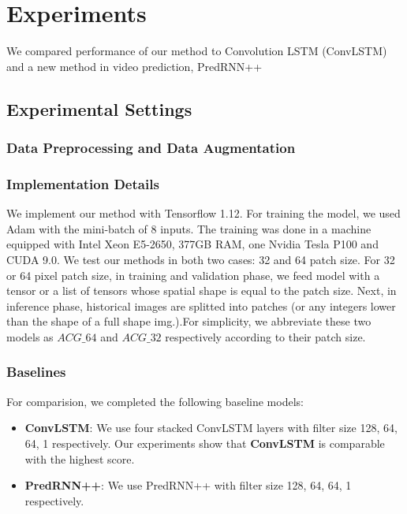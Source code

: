 \section{Experiments}
We compared performance of our method to Convolution LSTM (ConvLSTM) and a new method in video prediction, PredRNN++ %

\subsection{Experimental Settings}
\subsubsection{Data Preprocessing and Data Augmentation}

\subsubsection{Implementation Details}
We implement our method with Tensorflow 1.12. %
For training the model, we used Adam %
with the mini-batch of 8 inputs. The training was done in a machine equipped with Intel Xeon E5-2650, 377GB RAM, one Nvidia Tesla P100 and CUDA 9.0. We test our methods in both two cases: 32 and 64 patch size. For 32 or 64 pixel patch size, in training and validation phase, we feed model with a tensor or a list of tensors whose spatial shape is equal to the patch size. Next, in inference phase, historical images are splitted into patches (or any integers lower than the shape of a full shape img.).For simplicity, we abbreviate these two models as $ACG\_64$ and $ACG\_32$ respectively according to their patch size.  

\subsubsection{Baselines}
For comparision, we completed the following baseline models:
\begin{itemize}
    \item \textbf{ConvLSTM}: We use four stacked ConvLSTM layers with filter size 128, 64, 64, 1 respectively. Our experiments show that \textbf{ConvLSTM} is comparable with the highest score.
    \item \textbf{PredRNN++}: We use PredRNN++ with filter size 128, 64, 64, 1 respectively.
\end{itemize}

